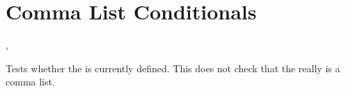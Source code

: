 \documentclass[oneside]{book}
\begin{document}
% 

\section{Comma List Conditionals}

\begin{function}{\ClistIfExist,\ClistIfExistTF}
\begin{syntax}
 
   
\end{syntax}
Tests whether the  is currently defined.  This does
not check that the  really is a comma list.
\end{function}
\end{document}
